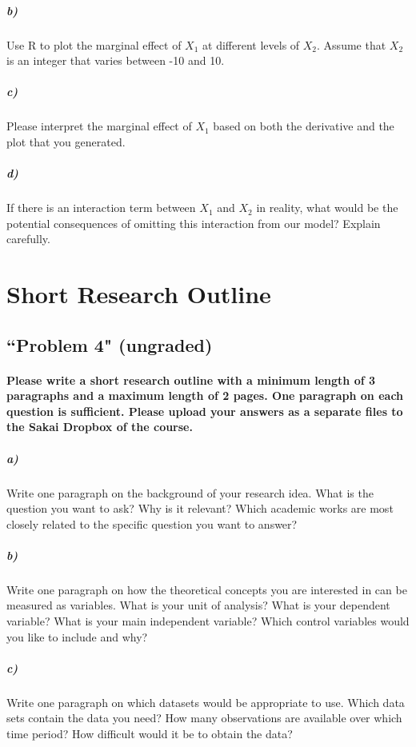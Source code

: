 \documentclass[12pt]{article}
\begin{document}
\subparagraph{b)} Use R to plot the marginal effect of $X_1$ at different levels of $X_2$. Assume that $X_2$ is an integer that varies between -10 and 10.

\subparagraph{c)} Please interpret the marginal effect of $X_1$ based on both the derivative and the plot that you generated.

\subparagraph{d)} If there is an interaction term between $X_1$ and $X_2$ in reality, what would be the potential consequences of omitting this interaction from our model? Explain carefully.



\section*{Short Research Outline}

\subsection*{``Problem 4" (ungraded)}

\paragraph{Please write a short research outline with a minimum length of 3 paragraphs and a maximum length of 2 pages. One paragraph on each question is sufficient. Please upload your answers as a separate files to the Sakai Dropbox of the course.}

\subparagraph{a)} Write one paragraph on the background of your research idea. What is the question you want to ask? Why is it relevant? Which academic works are most closely related to the specific question you want to answer?

\subparagraph{b)} Write one paragraph on how the theoretical concepts you are interested in can be measured as variables. What is your unit of analysis? What is your dependent variable? What is your main independent variable? Which control variables would you like to include and why?

\subparagraph{c)} Write one paragraph on which datasets would be appropriate to use. Which data sets contain the data you need? How many observations are available over which time period? How difficult would it be to obtain the data?
\end{document}
